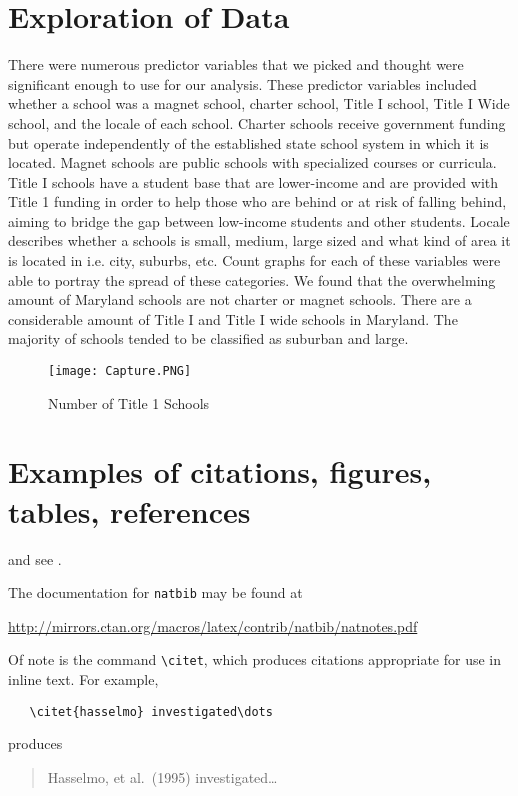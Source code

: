 \documentclass[12pt]{article}
\begin{document}
\section{Exploration of Data}
There were numerous predictor variables that we picked and thought were significant enough to use for our analysis. These predictor variables included whether a school was a magnet school, charter school, Title I school, Title I Wide school, and the locale of each school. Charter schools receive government funding but operate independently of the established state school system in which it is located. Magnet schools are public schools with specialized courses or curricula. Title I schools have a student base that are lower-income and are provided with Title 1 funding in order to help those who are behind or at risk of falling behind, aiming to bridge the gap between low-income students and other students. Locale describes whether a schools is small, medium, large sized and what kind of area it is located in i.e. city, suburbs, etc. Count graphs for each of these variables were able to portray the spread of these categories. We found that the overwhelming amount of Maryland schools are not charter or magnet schools. There are a considerable amount of Title I and Title I wide schools in Maryland. The majority of schools tended to be classified as suburban and large.

\begin{figure}[!htb]
  \centering
  \texttt{[image: Capture.PNG]}
  \caption{Number of Title 1 Schools}
  \label{fig:fig1}
\end{figure}

\section{Examples of citations, figures, tables, references}
\label{sec:others}
\lipsum[8] \cite{kour2014real,kour2014fast} and see \cite{hadash2018estimate}.

The documentation for \verb+natbib+ may be found at
\begin{center}
  \url{http://mirrors.ctan.org/macros/latex/contrib/natbib/natnotes.pdf}
\end{center}
Of note is the command \verb+\citet+, which produces citations
appropriate for use in inline text.  For example,
\begin{verbatim}
   \citet{hasselmo} investigated\dots
\end{verbatim}
produces
\begin{quote}
  Hasselmo, et al.\ (1995) investigated\dots
\end{quote}
\end{document}
